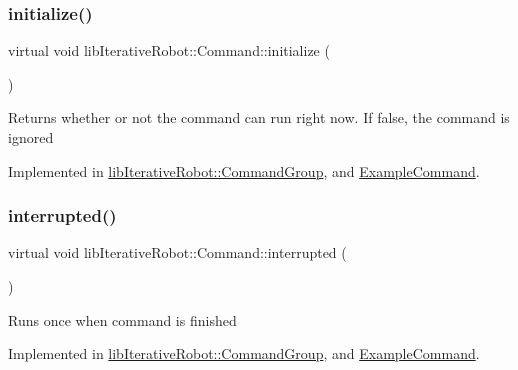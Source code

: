\subsubsection{\texorpdfstring{initialize()}{initialize()}}
{\footnotesize\ttfamily virtual void lib\+Iterative\+Robot\+::\+Command\+::initialize (\begin{DoxyParamCaption}{ }\end{DoxyParamCaption})\hspace{0.3cm}{\ttfamily [pure virtual]}}

Returns whether or not the command can run right now. If false, the command is ignored 

Implemented in \mbox{\hyperlink{classlib_iterative_robot_1_1_command_group_a99800c5dbd05ab750aa0bb27518d0467}{lib\+Iterative\+Robot\+::\+Command\+Group}}, and \mbox{\hyperlink{class_example_command_ae7bea17127c1697acbf90d6022eb5b5d}{Example\+Command}}.

\mbox{\label{classlib_iterative_robot_1_1_command_a1c17b601d1b69822cabadb92069d1747}} 
\subsubsection{\texorpdfstring{interrupted()}{interrupted()}}
{\footnotesize\ttfamily virtual void lib\+Iterative\+Robot\+::\+Command\+::interrupted (\begin{DoxyParamCaption}{ }\end{DoxyParamCaption})\hspace{0.3cm}{\ttfamily [pure virtual]}}

Runs once when command is finished 

Implemented in \mbox{\hyperlink{classlib_iterative_robot_1_1_command_group_a5174a8e63675bead12b84e39df0ae90e}{lib\+Iterative\+Robot\+::\+Command\+Group}}, and \mbox{\hyperlink{class_example_command_ae5a4bb67aa6e6c6234c3dca8eb7ad7ec}{Example\+Command}}.

\mbox{\label{classlib_iterative_robot_1_1_command_a8e4dccdd88f432a716090f532ba097f7}} 
